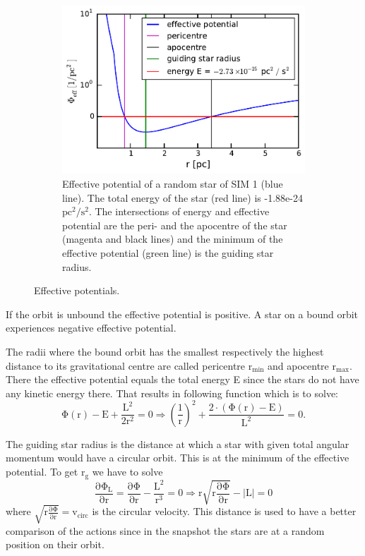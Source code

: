 \begin{figure}[htbp]
\begin{subfigure}{0.475\textwidth}
	\end{subfigure}
	\hfill
	\begin{subfigure}{0.475\textwidth}
	\includegraphics[width=\textwidth]{Plots/pot_eff_theory_part.pdf}
	\caption{Effective potential of a random star of SIM 1 (blue line). The total energy of the star (red line) is -1.88e-24 \(\mathrm{pc}^2/\mathrm{s}^2\). The intersections of energy and effective potential are the peri- and the apocentre of the star (magenta and black lines) and the minimum of the effective potential (green line) is the guiding star radius.}
	\label{fig:pot_eff_theory_part}
	\end{subfigure}
\caption{Effective potentials.}
\label{fig:pot_eff_theory}
\end{figure}
If the orbit is unbound the effective potential is positive. A star on a bound orbit experiences negative effective potential. 
\par The radii where the bound orbit has the smallest respectively the highest distance to its gravitational centre are called pericentre \(\mathrm{r_{min}}\)  and apocentre \(\mathrm{r_{max}}\).  There the effective potential equals the total energy E since the stars do not have any kinetic energy there. That results in following function which is to solve: 
\begin{equation}\label{eq:root_pot_eff}
\mathrm {\Phi(r)-E +\frac{L^2}{2r^2}=0\Rightarrow\left(\frac{1}{r}\right)^2+\frac{2\cdot (\Phi(r)-E)}{L^2}=0.}
\end{equation}
\par The guiding star radius is the distance at which a star with given total angular momentum would have a circular orbit. This is at the minimum of the effective potential. To get \(\mathrm{r_g}\) we have to solve
\begin{equation}\label{eq:min_pot_eff}
\mathrm{\frac{\partial\Phi_L}{\partial r}=\frac{\partial\Phi}{\partial r}-\frac{L^2}{r^3}=0\Rightarrow r\sqrt{r\frac{\partial\Phi}{\partial r}}-|L|=0}
\end{equation} where \(\mathrm{\sqrt{r\frac{\partial\Phi}{\partial r}}=v_{circ}}\) is the circular velocity. This distance is used to have a better comparison of the actions since in the snapshot the stars are at a random position on their orbit.

